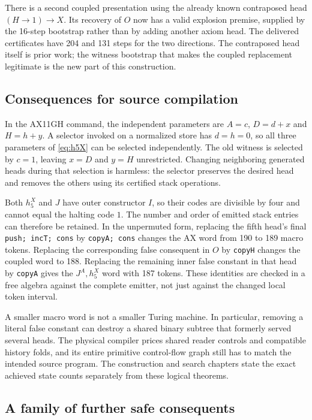 There is a second coupled presentation using the already known
contraposed head $(H\to1)\to X$.  Its recovery of $O$ now has a valid
explosion premise, supplied by the 16-step bootstrap rather than by
adding another axiom head.  The delivered certificates have 204 and 131
steps for the two directions.  The contraposed head itself is prior
work; the witness bootstrap that makes the coupled replacement
legitimate is the new part of this construction.

\subsection{Consequences for source compilation}

In the AX11GH command, the independent parameters are
$A=c$, $D=d+x$ and $H=h+y$.  A selector invoked on a normalized store
has $d=h=0$, so all three parameters of \eqref{eq:h5X} can be selected
independently.  The old witness is selected by $c=1$, leaving $x=D$
and $y=H$ unrestricted.  Changing neighboring generated heads during
that selection is harmless: the selector preserves the desired head
and removes the others using its certified stack operations.

Both $h_5^X$ and $J$ have outer constructor $I$, so their codes are
divisible by four and cannot equal the halting code $1$.  The number
and order of emitted stack entries can therefore be retained.  In the
unpermuted form, replacing the fifth head's final
\texttt{push; incT; cons} by \texttt{copyA; cons} changes the AX word
from 190 to 189 macro tokens.  Replacing the corresponding false
consequent in $O$ by \texttt{copyH} changes the coupled word to 188.
Replacing the remaining inner false constant in that head by
\texttt{copyA} gives the $J^A,h_5^X$ word with 187 tokens.
These identities are checked in a free algebra against the complete
emitter, not just against the changed local token interval.

A smaller macro word is not a smaller Turing machine.  In particular,
removing a literal false constant can destroy a shared binary subtree
that formerly served several heads.  The physical compiler prices
shared reader controls and compatible history folds, and its entire
primitive control-flow graph still has to match the intended source
program.  The construction and search chapters state the exact
achieved state counts separately from these logical theorems.

\subsection{A family of further safe consequents}

